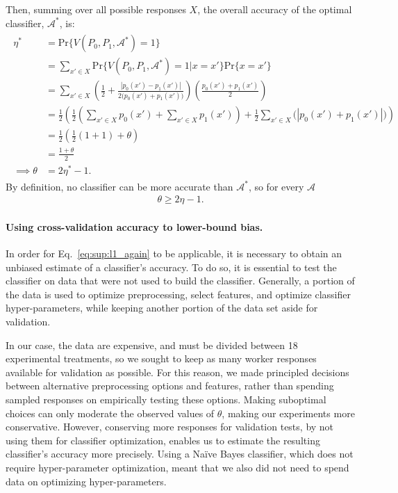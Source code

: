 \documentclass[12pt]{article}
\begin{document}
Then, summing over all possible responses $X$, 
the overall accuracy of the optimal classifier, $\mathcal{A^*}$, is:
\begin{align}
	\begin{split}
	\eta^* &= \mathrm{Pr}\{V(P_0, P_1, \mathcal{A}^*)=1\} \\
	&=\sum_{x'\in X} \mathrm{Pr}\{V(P_0,P_1,\mathcal{A}^*) = 1 | x = x' \} \mathrm{Pr}\{x = x'\}\\
		&= \sum_{x'\in X} \left(
				\frac{1}{2} + 
				\frac{|p_0(x') - p_1(x')|}{2 \big(p_0(x') + p_1(x') \big)}
			\right)
			\left(
				\frac{p_0(x') + p_1(x')}{2}
			\right)\\
		&= \frac{1}{2}\left(
				\frac{1}{2}(
					\sum_{x' \in X}p_0(x') + \sum_{x' \in X}p_1(x')
				) + 
				\frac{1}{2} \sum_{x' \in X} \big(|p_0(x') + p_1(x')|\big)
			\right) \\
		&= \frac{1}{2} \left( \frac{1}{2}(1 + 1) + \theta \right)\\
		&= \frac{1 + \theta}{2}\\
		\implies \theta &= 2\eta^* - 1.
	\end{split}
\end{align}
By definition, no classifier can be more accurate than $\mathcal{A^*}$, so
for every $\mathcal{A}$
\begin{align}
		\theta \geq 2\eta - 1.
		\label{eq:sup:l1_again}
\end{align}

\paragraph{Using cross-validation accuracy to lower-bound bias.}
	In order for Eq.~\ref{eq:sup:l1_again} to be applicable, it is necessary to 
	obtain an unbiased estimate of a classifier's accuracy.  To do so, it is
	essential to test the classifier on data that were not used to build 
	the classifier.  Generally, a portion of the data is used to
	optimize preprocessing, select features, and optimize 
	classifier hyper-parameters, while keeping another portion of the data
	set aside for validation.

	In our case, the data are expensive, and must be divided between 18
	experimental treatments, so we sought to keep as many worker responses
	available 
	for validation
	as possible.  For this reason, we made principled decisions 
	between alternative preprocessing options and features, 
	rather than spending sampled responses on empirically testing these 
	options.  Making
	suboptimal choices can only moderate the observed values 
	of $\theta$, making our experiments more conservative. 
	However, conserving more responses for validation 
	tests, by not using them for classifier optimization, 
	enables us to estimate the resulting classifier's accuracy more precisely.
	Using a Na\"ive Bayes classifier, which does not require hyper-parameter 
	optimization, meant that we also did not need to spend data on 
	optimizing hyper-parameters.  
	
\end{document}

